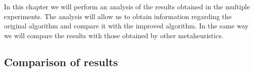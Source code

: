 In this chapter we will perform an analysis of the results obtained in the multiple experiments. The analysis will allow us to obtain information regarding the original algorithm and compare it with the improved algorithm. In the same way we will compare the results with those obtained by other metaheuristics.

\subsection{Comparison of results}
